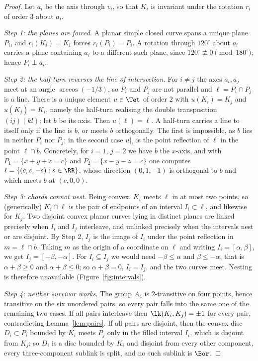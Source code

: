 \begin{proof}
Let $a_i$ be the axis through $v_i$, so that $K_i$ is invariant under the
rotation $r_i$ of order $3$ about $a_i$.

\emph{Step 1: the planes are forced.} A planar simple closed curve spans a
unique plane $P_i$, and $r_i(K_i)=K_i$ forces $r_i(P_i)=P_i$. A rotation through
$120^\circ$ about $a_i$ carries a plane containing $a_i$ to a different such
plane, since $120^\circ\not\equiv0\pmod{180^\circ}$; hence $P_i\perp a_i$.

\emph{Step 2: the half-turn reverses the line of intersection.} For $i\neq j$
the axes $a_i,a_j$ meet at an angle $\arccos(-1/3)$, so $P_i$ and $P_j$ are not
parallel and $\ell=P_i\cap P_j$ is a line. There is a unique element $u\in\Tet$
of order $2$ with $u(K_i)=K_j$ and $u(K_j)=K_i$, namely the half-turn realising
the double transposition $(ij)(kl)$; let $b$ be its axis. Then $u(\ell)=\ell$. A
half-turn carries a line to itself only if the line is $b$, or meets $b$
orthogonally. The first is impossible, as $b$ lies in neither $P_i$ nor $P_j$;
in the second case $u|_\ell$ is the point reflection of $\ell$ in the point
$\ell\cap b$. Concretely, for $i=1$, $j=2$ we have $b$ the $x$-axis, and with
$P_1=\{x+y+z=c\}$ and $P_2=\{x-y-z=c\}$ one computes
$\ell=\{(c,s,-s):s\in\RR\}$, whose direction $(0,1,-1)$ is orthogonal to $b$ and
which meets $b$ at $(c,0,0)$.

\emph{Step 3: chords cannot nest.} Being convex, $K_i$ meets $\ell$ in at most
two points, so (generically) $K_i\cap\ell$ is the pair of endpoints of an
interval $I_i\subset\ell$, and likewise for $K_j$. Two disjoint convex planar
curves lying in distinct planes are linked precisely when $I_i$ and $I_j$
interleave, and unlinked precisely when the intervals nest or are disjoint. By
Step 2, $I_j$ is the image of $I_i$ under the point reflection in
$m=\ell\cap b$. Taking $m$ as the origin of a coordinate on $\ell$ and writing
$I_i=[\alpha,\beta]$, we get $I_j=[-\beta,-\alpha]$. For $I_i\subseteq I_j$ we
would need $-\beta\le\alpha$ and $\beta\le-\alpha$, that is
$\alpha+\beta\ge0$ and $\alpha+\beta\le0$; so $\alpha+\beta=0$, $I_i=I_j$, and
the two curves meet. Nesting is therefore unavailable
(Figure~\ref{fig:intervals}).

\emph{Step 4: neither survivor works.} The group $A_4$ is $2$-transitive on four
points, hence transitive on the six unordered pairs, so every pair falls into
the same one of the remaining two cases. If all pairs interleave then
$\lk(K_i,K_j)=\pm1$ for every pair, contradicting Lemma~\ref{lem:pairs}. If all
pairs are disjoint, then the convex disc $D_i\subset P_i$ bounded by $K_i$ meets
$P_j$ only in the filled interval $I_i$, which is disjoint from $K_j$; so $D_i$
is a disc bounded by $K_i$ and disjoint from every other component, every
three-component sublink is split, and no such sublink is $\Bor$.
\end{proof}

